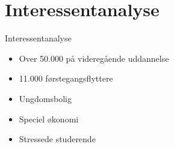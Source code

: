 \section{Interessentanalyse}
\begin{frame}{Interessentanalyse}{}

\begin{itemize}
\item Over 50.000 på videregående uddannelse
\item 11.000 førstegangsflyttere
\item Ungdomsbolig
\item Speciel økonomi
\item Stressede studerende
\end{itemize}
\end{frame}